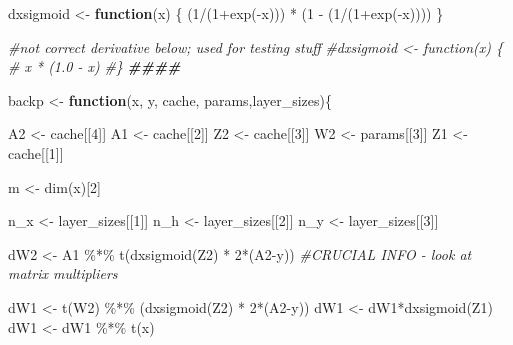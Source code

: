 \documentclass[
]{article}
\newenvironment{Shaded}{\begin{snugshade}}{\end{snugshade}}
\newcommand{\CommentTok}[1]{\textcolor[rgb]{0.56,0.35,0.01}{\textit{#1}}}
\newcommand{\ControlFlowTok}[1]{\textcolor[rgb]{0.13,0.29,0.53}{\textbf{#1}}}
\newcommand{\DecValTok}[1]{\textcolor[rgb]{0.00,0.00,0.81}{#1}}
\newcommand{\DocumentationTok}[1]{\textcolor[rgb]{0.56,0.35,0.01}{\textbf{\textit{#1}}}}
\newcommand{\FunctionTok}[1]{\textcolor[rgb]{0.00,0.00,0.00}{#1}}
\newcommand{\NormalTok}[1]{#1}
\newcommand{\OtherTok}[1]{\textcolor[rgb]{0.56,0.35,0.01}{#1}}
\newcommand{\SpecialCharTok}[1]{\textcolor[rgb]{0.00,0.00,0.00}{#1}}
\begin{document}
\begin{Shaded}
\begin{Highlighting}[]
\NormalTok{dxsigmoid }\OtherTok{\textless{}{-}} \ControlFlowTok{function}\NormalTok{(x) \{}
\NormalTok{  (}\DecValTok{1}\SpecialCharTok{/}\NormalTok{(}\DecValTok{1}\SpecialCharTok{+}\FunctionTok{exp}\NormalTok{(}\SpecialCharTok{{-}}\NormalTok{x))) }\SpecialCharTok{*}\NormalTok{ (}\DecValTok{1} \SpecialCharTok{{-}}\NormalTok{ (}\DecValTok{1}\SpecialCharTok{/}\NormalTok{(}\DecValTok{1}\SpecialCharTok{+}\FunctionTok{exp}\NormalTok{(}\SpecialCharTok{{-}}\NormalTok{x))))}
\NormalTok{\}}

\CommentTok{\#not correct derivative below; used for testing stuff}
\CommentTok{\#dxsigmoid \textless{}{-} function(x) \{}
\CommentTok{\#  x * (1.0 {-} x)}
\CommentTok{\#\}}
\DocumentationTok{\#\#\#\#}

\NormalTok{backp }\OtherTok{\textless{}{-}} \ControlFlowTok{function}\NormalTok{(x, y, cache, params,layer\_sizes)\{}

\NormalTok{  A2 }\OtherTok{\textless{}{-}}\NormalTok{ cache[[}\DecValTok{4}\NormalTok{]]}
\NormalTok{  A1 }\OtherTok{\textless{}{-}}\NormalTok{ cache[[}\DecValTok{2}\NormalTok{]]}
\NormalTok{  Z2 }\OtherTok{\textless{}{-}}\NormalTok{ cache[[}\DecValTok{3}\NormalTok{]]}
\NormalTok{  W2 }\OtherTok{\textless{}{-}}\NormalTok{ params[[}\DecValTok{3}\NormalTok{]]}
\NormalTok{  Z1 }\OtherTok{\textless{}{-}}\NormalTok{ cache[[}\DecValTok{1}\NormalTok{]]}
  
\NormalTok{    m }\OtherTok{\textless{}{-}} \FunctionTok{dim}\NormalTok{(x)[}\DecValTok{2}\NormalTok{]}
  
\NormalTok{  n\_x }\OtherTok{\textless{}{-}}\NormalTok{ layer\_sizes[[}\DecValTok{1}\NormalTok{]]}
\NormalTok{  n\_h }\OtherTok{\textless{}{-}}\NormalTok{ layer\_sizes[[}\DecValTok{2}\NormalTok{]]}
\NormalTok{  n\_y }\OtherTok{\textless{}{-}}\NormalTok{ layer\_sizes[[}\DecValTok{3}\NormalTok{]]}
  
\NormalTok{  dW2 }\OtherTok{\textless{}{-}}\NormalTok{ A1 }\SpecialCharTok{\%*\%} \FunctionTok{t}\NormalTok{(}\FunctionTok{dxsigmoid}\NormalTok{(Z2) }\SpecialCharTok{*} \DecValTok{2}\SpecialCharTok{*}\NormalTok{(A2}\SpecialCharTok{{-}}\NormalTok{y)) }\CommentTok{\#CRUCIAL INFO {-} look at matrix multipliers}
  
\NormalTok{  dW1 }\OtherTok{\textless{}{-}} \FunctionTok{t}\NormalTok{(W2) }\SpecialCharTok{\%*\%}\NormalTok{ (}\FunctionTok{dxsigmoid}\NormalTok{(Z2) }\SpecialCharTok{*} \DecValTok{2}\SpecialCharTok{*}\NormalTok{(A2}\SpecialCharTok{{-}}\NormalTok{y))}
\NormalTok{  dW1 }\OtherTok{\textless{}{-}}\NormalTok{ dW1}\SpecialCharTok{*}\FunctionTok{dxsigmoid}\NormalTok{(Z1)}
\NormalTok{  dW1 }\OtherTok{\textless{}{-}}\NormalTok{ dW1 }\SpecialCharTok{\%*\%} \FunctionTok{t}\NormalTok{(x)}
  

\end{Highlighting}
\end{Shaded}
\end{document}
